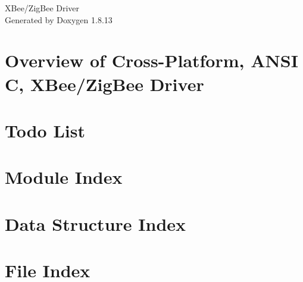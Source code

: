 \documentclass[twoside]{book}
\newcommand{\+}{\discretionary{\mbox{\scriptsize$\hookleftarrow$}}{}{}}
\newcommand{\clearemptydoublepage}{%
  \newpage{\pagestyle{empty}\cleardoublepage}%
}
\begin{document}
\hypersetup{pageanchor=false,
             bookmarksnumbered=true,
             pdfencoding=unicode
            }
\begin{titlepage}
\vspace*{7cm}
\begin{center}%
{\Large X\+Bee/\+Zig\+Bee Driver }\\
\vspace*{1cm}
{\large Generated by Doxygen 1.8.13}\\
\end{center}
\end{titlepage}
\clearemptydoublepage
{}
\tableofcontents
\clearemptydoublepage
{}
\hypersetup{pageanchor=true}

\chapter{Overview of Cross-\/\+Platform, A\+N\+SI C, X\+Bee/\+Zig\+Bee Driver}
\label{index}\hypertarget{index}{}
\chapter{Todo List}
\label{todo}

\chapter{Module Index}

\chapter{Data Structure Index}

\chapter{File Index}

\end{document}
